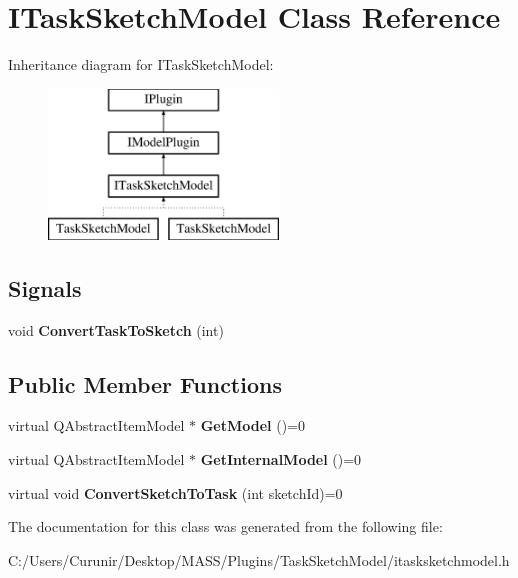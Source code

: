 \hypertarget{class_i_task_sketch_model}{}\section{I\+Task\+Sketch\+Model Class Reference}
\label{class_i_task_sketch_model}
Inheritance diagram for I\+Task\+Sketch\+Model\+:\begin{figure}[H]
\begin{center}
\leavevmode
\includegraphics[height=4.000000cm]{class_i_task_sketch_model}
\end{center}
\end{figure}
\subsection*{Signals}
\begin{DoxyCompactItemize}
\item 
\mbox{\label{class_i_task_sketch_model_a0bd379546cbb601a0ba0027ba41c22eb}} 
void {\bfseries Convert\+Task\+To\+Sketch} (int)
\end{DoxyCompactItemize}
\subsection*{Public Member Functions}
\begin{DoxyCompactItemize}
\item 
\mbox{\label{class_i_task_sketch_model_afd9ecfd849e9a10cae71d9d87ae34e5b}} 
virtual Q\+Abstract\+Item\+Model $\ast$ {\bfseries Get\+Model} ()=0
\item 
\mbox{\label{class_i_task_sketch_model_a321be8117a6275d0716c07241d7e402a}} 
virtual Q\+Abstract\+Item\+Model $\ast$ {\bfseries Get\+Internal\+Model} ()=0
\item 
\mbox{\label{class_i_task_sketch_model_aef1346d2236510066f9dc8b0c1f68916}} 
virtual void {\bfseries Convert\+Sketch\+To\+Task} (int sketch\+Id)=0
\end{DoxyCompactItemize}


The documentation for this class was generated from the following file\+:\begin{DoxyCompactItemize}
\item 
C\+:/\+Users/\+Curunir/\+Desktop/\+M\+A\+S\+S/\+Plugins/\+Task\+Sketch\+Model/itasksketchmodel.\+h\end{DoxyCompactItemize}
